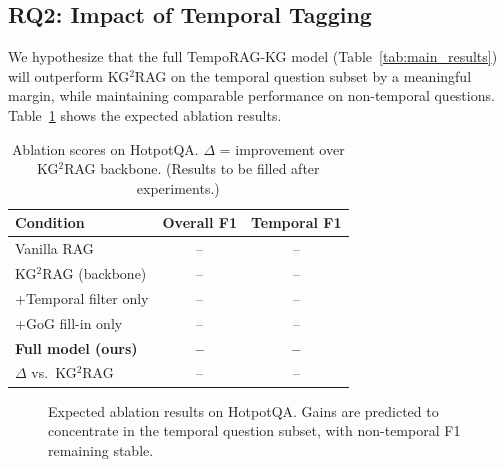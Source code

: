 \documentclass[11pt]{article}
\begin{document}
\subsection{RQ2: Impact of Temporal Tagging}

We hypothesize that the full TempoRAG-KG model (Table~\ref{tab:main_results})
will outperform KG$^2$RAG on the temporal question subset by a meaningful
margin, while maintaining comparable performance on non-temporal questions.
Table~\ref{tab:ablation_scores} shows the expected ablation results.

\begin{table}[t]
  \centering
  \small
  \begin{tabular}{lcc}
    \toprule
    \textbf{Condition} & \textbf{Overall F1} & \textbf{Temporal F1} \\
    \midrule
    Vanilla RAG                     & -- & -- \\
    KG$^2$RAG (backbone)            & -- & -- \\
    \quad +Temporal filter only     & -- & -- \\
    \quad +GoG fill-in only         & -- & -- \\
    \quad \textbf{Full model (ours)}& \textbf{--} & \textbf{--} \\
    \midrule
    $\Delta$ vs.\ KG$^2$RAG        & --  & -- \\
    \bottomrule
  \end{tabular}
  \caption{Ablation scores on HotpotQA. $\Delta$ = improvement over
  KG$^2$RAG backbone. (Results to be filled after experiments.)}
  \label{tab:ablation_scores}
\end{table}

\begin{figure}[t]
  \centering
  \caption{Expected ablation results on HotpotQA. Gains are predicted
  to concentrate in the temporal question subset, with non-temporal F1
  remaining stable.}
  \label{fig:ablation}
\end{figure}
\end{document}

